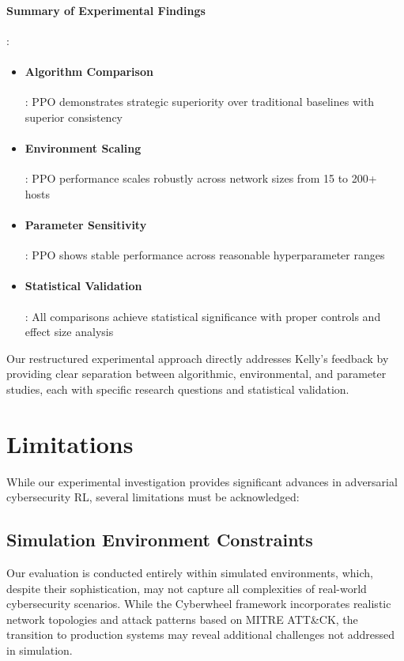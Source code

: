\documentclass[12pt,oneside]{article}
\begin{document}
\paragraph{Summary of Experimental Findings}:
\begin{itemize}
\item \paragraph{Algorithm Comparison}: PPO demonstrates strategic superiority over traditional baselines with superior consistency
\item \paragraph{Environment Scaling}: PPO performance scales robustly across network sizes from 15 to 200+ hosts  
\item \paragraph{Parameter Sensitivity}: PPO shows stable performance across reasonable hyperparameter ranges
\item \paragraph{Statistical Validation}: All comparisons achieve statistical significance with proper controls and effect size analysis
\end{itemize}

Our restructured experimental approach directly addresses Kelly's feedback by providing clear separation between algorithmic, environmental, and parameter studies, each with specific research questions and statistical validation.

\section{Limitations}

While our experimental investigation provides significant advances in adversarial cybersecurity RL, several limitations must be acknowledged:

\subsection{Simulation Environment Constraints}

Our evaluation is conducted entirely within simulated environments, which, despite their sophistication, may not capture all complexities of real-world cybersecurity scenarios. While the Cyberwheel framework incorporates realistic network topologies and attack patterns based on MITRE ATT\&CK, the transition to production systems may reveal additional challenges not addressed in simulation.
\end{document}
